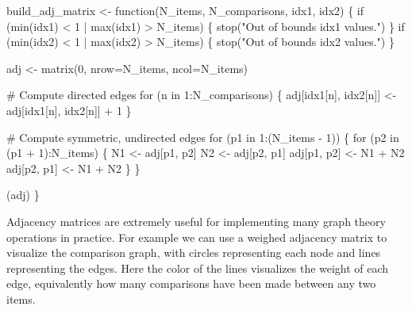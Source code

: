 \documentclass[
  letterpaper,
  DIV=11,
  numbers=noendperiod]{scrartcl}
\newenvironment{Shaded}{\begin{snugshade}}{\end{snugshade}}
\newcommand{\AttributeTok}[1]{\textcolor[rgb]{0.40,0.45,0.13}{#1}}
\newcommand{\CommentTok}[1]{\textcolor[rgb]{0.37,0.37,0.37}{#1}}
\newcommand{\ControlFlowTok}[1]{\textcolor[rgb]{0.00,0.23,0.31}{#1}}
\newcommand{\DecValTok}[1]{\textcolor[rgb]{0.68,0.00,0.00}{#1}}
\newcommand{\FunctionTok}[1]{\textcolor[rgb]{0.28,0.35,0.67}{#1}}
\newcommand{\NormalTok}[1]{\textcolor[rgb]{0.00,0.23,0.31}{#1}}
\newcommand{\OtherTok}[1]{\textcolor[rgb]{0.00,0.23,0.31}{#1}}
\newcommand{\SpecialCharTok}[1]{\textcolor[rgb]{0.37,0.37,0.37}{#1}}
\newcommand{\StringTok}[1]{\textcolor[rgb]{0.13,0.47,0.30}{#1}}
\begin{document}
\begin{Shaded}
\begin{Highlighting}[]
\NormalTok{build\_adj\_matrix }\OtherTok{\textless{}{-}} \ControlFlowTok{function}\NormalTok{(N\_items, N\_comparisons, idx1, idx2) \{}
  \ControlFlowTok{if}\NormalTok{ (}\FunctionTok{min}\NormalTok{(idx1) }\SpecialCharTok{\textless{}} \DecValTok{1} \SpecialCharTok{|} \FunctionTok{max}\NormalTok{(idx1) }\SpecialCharTok{\textgreater{}}\NormalTok{ N\_items) \{}
    \FunctionTok{stop}\NormalTok{(}\StringTok{"Out of bounds idx1 values."}\NormalTok{)}
\NormalTok{  \}}
  \ControlFlowTok{if}\NormalTok{ (}\FunctionTok{min}\NormalTok{(idx2) }\SpecialCharTok{\textless{}} \DecValTok{1} \SpecialCharTok{|} \FunctionTok{max}\NormalTok{(idx2) }\SpecialCharTok{\textgreater{}}\NormalTok{ N\_items) \{}
    \FunctionTok{stop}\NormalTok{(}\StringTok{"Out of bounds idx2 values."}\NormalTok{)}
\NormalTok{  \}}

\NormalTok{  adj }\OtherTok{\textless{}{-}} \FunctionTok{matrix}\NormalTok{(}\DecValTok{0}\NormalTok{, }\AttributeTok{nrow=}\NormalTok{N\_items, }\AttributeTok{ncol=}\NormalTok{N\_items)}

  \CommentTok{\# Compute directed edges}
  \ControlFlowTok{for}\NormalTok{ (n }\ControlFlowTok{in} \DecValTok{1}\SpecialCharTok{:}\NormalTok{N\_comparisons) \{}
\NormalTok{    adj[idx1[n], idx2[n]] }\OtherTok{\textless{}{-}}\NormalTok{ adj[idx1[n], idx2[n]] }\SpecialCharTok{+} \DecValTok{1}
\NormalTok{  \}}

  \CommentTok{\# Compute symmetric, undirected edges}
  \ControlFlowTok{for}\NormalTok{ (p1 }\ControlFlowTok{in} \DecValTok{1}\SpecialCharTok{:}\NormalTok{(N\_items }\SpecialCharTok{{-}} \DecValTok{1}\NormalTok{)) \{}
    \ControlFlowTok{for}\NormalTok{ (p2 }\ControlFlowTok{in}\NormalTok{ (p1 }\SpecialCharTok{+} \DecValTok{1}\NormalTok{)}\SpecialCharTok{:}\NormalTok{N\_items) \{}
\NormalTok{      N1 }\OtherTok{\textless{}{-}}\NormalTok{ adj[p1, p2]}
\NormalTok{      N2 }\OtherTok{\textless{}{-}}\NormalTok{ adj[p2, p1]}
\NormalTok{      adj[p1, p2] }\OtherTok{\textless{}{-}}\NormalTok{ N1 }\SpecialCharTok{+}\NormalTok{ N2}
\NormalTok{      adj[p2, p1] }\OtherTok{\textless{}{-}}\NormalTok{ N1 }\SpecialCharTok{+}\NormalTok{ N2}
\NormalTok{    \}}
\NormalTok{  \}}

\NormalTok{  (adj)}
\NormalTok{\}}
\end{Highlighting}
\end{Shaded}

Adjacency matrices are extremely useful for implementing many graph
theory operations in practice. For example we can use a weighed
adjacency matrix to visualize the comparison graph, with circles
representing each node and lines representing the edges. Here the color
of the lines visualizes the weight of each edge, equivalently how many
comparisons have been made between any two items.
\end{document}
